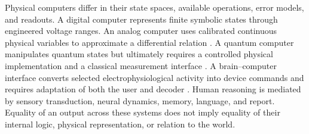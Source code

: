 Physical computers differ in their state spaces, available operations, error models, and readouts. A digital computer represents finite symbolic states through engineered voltage ranges. An analog computer uses calibrated continuous physical variables to approximate a differential relation \parencite{Shannon1941}. A quantum computer manipulates quantum states but ultimately requires a controlled physical implementation and a classical measurement interface \parencite{DiVincenzo2000,AharonovCotlerQi2022}. A brain--computer interface converts selected electrophysiological activity into device commands and requires adaptation of both the user and decoder \parencite{Wolpaw2002,Willett2023}. Human reasoning is mediated by sensory transduction, neural dynamics, memory, language, and report. Equality of an output across these systems does not imply equality of their internal logic, physical representation, or relation to the world.

